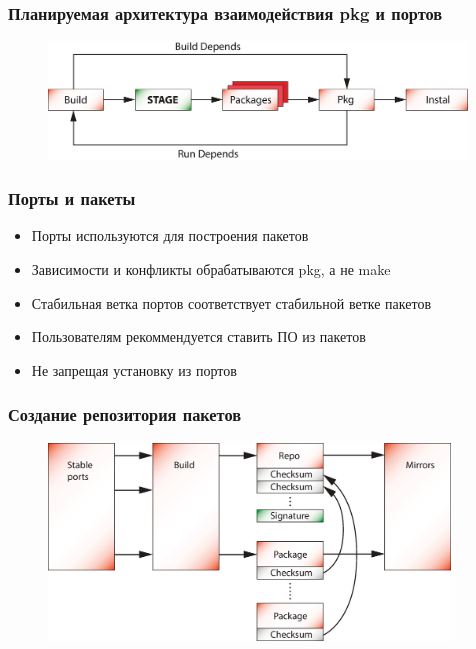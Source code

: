 \documentclass{beamer}
\begin{document}
\begin{frame}
\frametitle{Планируемая архитектура взаимодействия pkg и портов}
\begin{figure}[h!]
  \centering
  \includegraphics[width=0.99\textwidth]{q2.eps}
\end{figure}
\end{frame}

\begin{frame}
\frametitle{Порты и пакеты}
\begin{itemize}
  \item Порты используются для построения пакетов
  \item Зависимости и конфликты обрабатываются pkg, а не make
  \item Стабильная ветка портов соответствует стабильной ветке пакетов
  \item Пользователям рекоммендуется ставить ПО из пакетов
  \item Не запрещая установку из портов
\end{itemize} 
\end{frame}

\begin{frame}
\frametitle{Создание репозитория пакетов}
\begin{figure}[h!]
  \centering
  \includegraphics[width=0.95\textwidth]{q3.eps}
\end{figure}
\end{frame}
\end{document}
